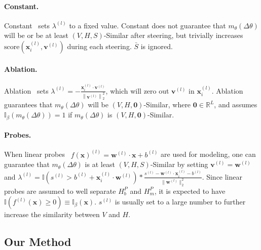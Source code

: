 \documentclass{article}
\theoremstyle{plain}
\theoremstyle{definition}
\theoremstyle{remark}
\begin{document}
\paragraph{Constant.} Constant~\cite{rep} sets $\lambda^{(l)}$ to a fixed value. Constant does not guarantee that $m_{\theta}(\Delta\theta)$ will be or be at least $(V, H, S)$-Similar after steering, but trivially increases $\text{score}(\mathbf{x}_{i}^{(l)}, \mathbf{v}^{(l)})$ during each steering. $\bar{S}$ is ignored.

\paragraph{Ablation.} Ablation~\cite{singleDirection, angle} sets $\lambda^{(l)} = - \frac{\mathbf{x}_{i}^{(l)} \cdot \mathbf{v}^{(l)}}{\left\|\mathbf{v}^{(l)}\right\|_{2}^{2}}$, which will zero out $\mathbf{v}^{(l)}$ in $\mathbf{x}_{i}^{(l)}$. Ablation guarantees that $m_{\theta}(\Delta\theta)$ will be $(V, H, \mathbf{0})$-Similar, where $\mathbf{0} \in \mathbb{R}^{L}$, and assumes $\mathbb{I}_{\beta}(m_{\theta}(\Delta\theta)) = 1$ if $m_{\theta}(\Delta\theta)$ is $(V, H, \mathbf{0})$-Similar.%

\paragraph{Probes.} When linear probes~\cite{scav, mera} $f(\mathbf{x})^{(l)} = \mathbf{w}^{(l)} \cdot \mathbf{x} + b^{(l)}$ are used for modeling, one can guarantee that $m_{\theta}(\Delta\theta)$ is at least $(V, H, S)$-Similar by setting $\mathbf{v}^{(l)} = \mathbf{w}^{(l)}$ and $\lambda^{(l)} = \mathbb{I}(s^{(l)} > b^{(l)} + \mathbf{x}_{i}^{(l)} \cdot \mathbf{w}^{(l)}) * \frac{s^{(l)} - \mathbf{w}^{(l)}\cdot\mathbf{x}_{i}^{(l)}  - b^{(l)}}{\|\mathbf{w}^{(l)}\|_{2}^{2}}$. Since linear probes are assumed to well separate $H_{b}^{P}$ and $H_{m}^{P}$, it is expected to have $\mathbb{I}(f^{(l)}(\mathbf{x}) \ge 0) \equiv \mathbb{I}_{\beta}(\mathbf{x})$. $s^{(l)}$ is usually set to a large number to further increase the similarity between $V$ and $H$.




\subsection{Our Method}\label{sec:ourMethod}
\end{document}

